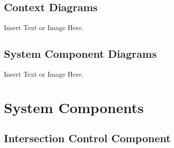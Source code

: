 \documentclass [11pt]{article}
\begin{document}
\subsection{Context Diagrams}
Insert Text or Image Here.

\subsection{System Component Diagrams}
Insert Text or Image Here. 





\section{System Components}
 
\subsection{Intersection Control Component}
\end{document}
